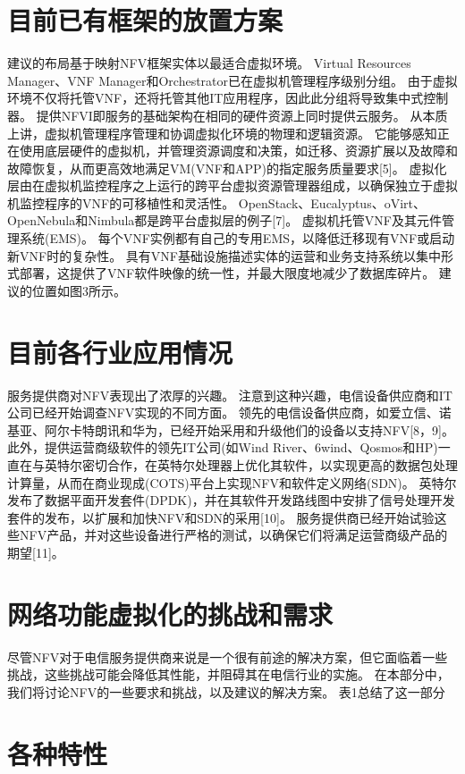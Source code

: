 \chapter{目前已有框架的放置方案}
建议的布局基于映射NFV框架实体以最适合虚拟环境。
Virtual Resources Manager、VNF Manager和Orchestrator已在虚拟机管理程序级别分组。
由于虚拟环境不仅将托管VNF，还将托管其他IT应用程序，因此此分组将导致集中式控制器。
提供NFVI即服务的基础架构在相同的硬件资源上同时提供云服务。
从本质上讲，虚拟机管理程序管理和协调虚拟化环境的物理和逻辑资源。
它能够感知正在使用底层硬件的虚拟机，并管理资源调度和决策，如迁移、资源扩展以及故障和故障恢复，从而更高效地满足VM(VNF和APP)的指定服务质量要求[5]。
虚拟化层由在虚拟机监控程序之上运行的跨平台虚拟资源管理器组成，以确保独立于虚拟机监控程序的VNF的可移植性和灵活性。
OpenStack、Eucalyptus、oVirt、OpenNebula和Nimbula都是跨平台虚拟层的例子[7]。
虚拟机托管VNF及其元件管理系统(EMS)。
每个VNF实例都有自己的专用EMS，以降低迁移现有VNF或启动新VNF时的复杂性。
具有VNF基础设施描述实体的运营和业务支持系统以集中形式部署，这提供了VNF软件映像的统一性，并最大限度地减少了数据库碎片。
建议的位置如图3所示。


\chapter{目前各行业应用情况}
服务提供商对NFV表现出了浓厚的兴趣。
注意到这种兴趣，电信设备供应商和IT公司已经开始调查NFV实现的不同方面。
领先的电信设备供应商，如爱立信、诺基亚、阿尔卡特朗讯和华为，已经开始采用和升级他们的设备以支持NFV[8，9]。
此外，提供运营商级软件的领先IT公司(如Wind River、6wind、Qosmos和HP)一直在与英特尔密切合作，在英特尔处理器上优化其软件，以实现更高的数据包处理计算量，从而在商业现成(COTS)平台上实现NFV和软件定义网络(SDN)。
英特尔发布了数据平面开发套件(DPDK)，并在其软件开发路线图中安排了信号处理开发套件的发布，以扩展和加快NFV和SDN的采用[10]。
服务提供商已经开始试验这些NFV产品，并对这些设备进行严格的测试，以确保它们将满足运营商级产品的期望[11]。

\chapter{网络功能虚拟化的挑战和需求}
尽管NFV对于电信服务提供商来说是一个很有前途的解决方案，但它面临着一些挑战，这些挑战可能会降低其性能，并阻碍其在电信行业的实施。
在本部分中，我们将讨论NFV的一些要求和挑战，以及建议的解决方案。
表1总结了这一部分

\chapter{各种特性}
